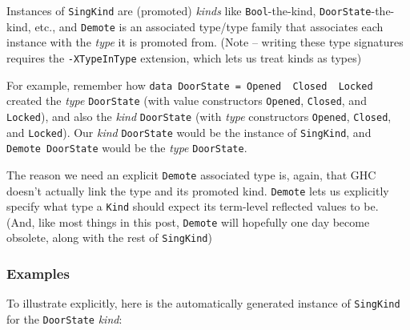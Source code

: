 \documentclass[]{article}
\begin{document}
Instances of \texttt{SingKind} are (promoted) \emph{kinds} like
\texttt{Bool}-the-kind, \texttt{DoorState}-the-kind, etc., and \texttt{Demote}
is an associated type/type family that associates each instance with the
\emph{type} it is promoted from. (Note -- writing these type signatures requires
the \texttt{-XTypeInType} extension, which lets us treat kinds as types)

For example, remember how
\texttt{data\ DoorState\ =\ Opened\ \textbar{}\ Closed\ \textbar{}\ Locked}
created the \emph{type} \texttt{DoorState} (with value constructors
\texttt{Opened}, \texttt{Closed}, and \texttt{Locked}), and also the \emph{kind}
\texttt{DoorState} (with \emph{type} constructors
\texttt{\textquotesingle{}Opened}, \texttt{\textquotesingle{}Closed}, and
\texttt{\textquotesingle{}Locked}). Our \emph{kind} \texttt{DoorState} would be
the instance of \texttt{SingKind}, and \texttt{Demote\ DoorState} would be the
\emph{type} \texttt{DoorState}.

The reason we need an explicit \texttt{Demote} associated type is, again, that
GHC doesn't actually link the type and its promoted kind. \texttt{Demote} lets
us explicitly specify what type a \texttt{Kind} should expect its term-level
reflected values to be. (And, like most things in this post, \texttt{Demote}
will hopefully one day become obsolete, along with the rest of
\texttt{SingKind})

\hypertarget{examples}{%
\subsubsection{Examples}\label{examples}}

To illustrate explicitly, here is the automatically generated instance of
\texttt{SingKind} for the \texttt{DoorState} \emph{kind}:
\end{document}
